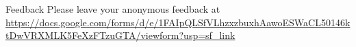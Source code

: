 \documentclass[usenames,dvipsnames, 9pt]{beamer}
\begin{document}
\begin{frame}{Feedback}
	Please leave your anonymous feedback at \\[10pt]
	\url{https://docs.google.com/forms/d/e/1FAIpQLSfVLhzxzbuxhAawoESWaCL50146ktDwVRXMLK5FeXzFTzuGTA/viewform?usp=sf_link}
	
	
\end{frame}
\end{document}

